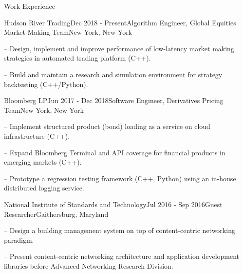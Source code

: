 \documentclass{resume} %
\begin{document}

\begin{rSection}{Work Experience}

\begin{rSubsection}{Hudson River Trading}{Dec 2018 - Present}{Algorithm Engineer, Global Equities Market Making Team}{New York, New York}

\item[--] Design, implement and improve performance of low-latency market making strategies in automated trading platform (C++).
\item[--] Build and maintain a research and simulation environment for strategy backtesting (C++/Python). 

\end{rSubsection}

\begin{rSubsection}{Bloomberg LP}{Jun 2017 - Dec 2018}{Software Engineer, Derivatives Pricing Team}{New York, New York}

\item[--] Implement structured product (bond) loading as a service on cloud infrastructure (C++).
\item[--] Expand Bloomberg Terminal and API coverage for financial products in emerging markets (C++).
\item[--] Prototype a regression testing framework (C++, Python) using an in-house distributed logging service.

\end{rSubsection}

\begin{rSubsection}{National Institute of Standards and Technology}{Jul 2016 - Sep 2016}{Guest Researcher}{Gaithersburg, Maryland}
\item[--] Design a building management system on top of content-centric networking paradigm.
\item[--] Present content-centric networking architecture and application development libraries before Advanced Networking Research Division.
\end{rSubsection}


\end{rSection}
\end{document}
